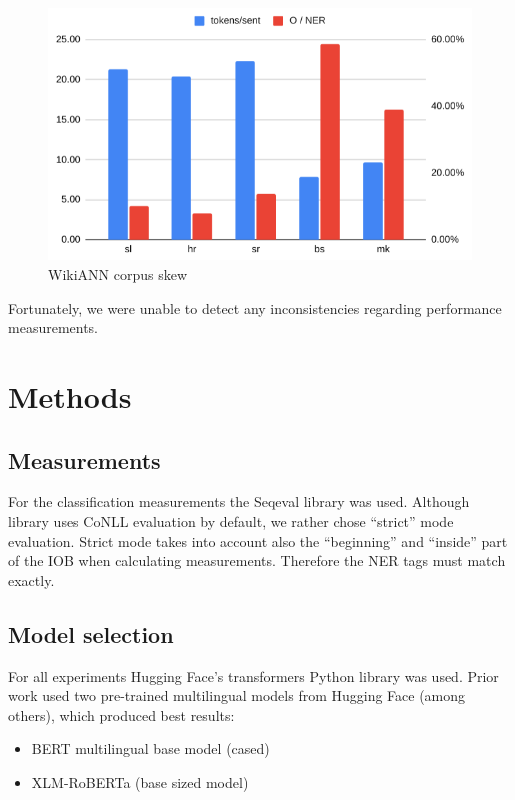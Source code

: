 \documentclass[sigconf]{acmart}
\begin{document}
\begin{figure}[h]
  \caption{WikiANN corpus skew}
  \label{fig:corpora_analysis}
  \centering
  \includegraphics[width=\linewidth]{wikiann-skew}
\end{figure}

Fortunately, we were unable to detect any inconsistencies regarding performance measurements.

\section{Methods}
\label{sec:methods}

\subsection{Measurements}
\label{subsec:measurements}
For the classification measurements the Seqeval library\cite{seqeval} was used.
Although library uses CoNLL evaluation by default, we rather chose ``strict'' mode evaluation.
Strict mode takes into account also the ``beginning'' and ``inside'' part of the IOB when calculating measurements.
Therefore the NER tags must match exactly.

\subsection{Model selection}
\label{subsec:model-selection}
For all experiments Hugging Face's transformers Python library\cite{wolf-etal-2020-transformers} was used.
Prior work used two pre-trained multilingual models from Hugging Face (among others), which produced best results:
\begin{itemize}
  \item BERT multilingual base model (cased)\cite{DBLP:journals/corr/abs-1810-04805}
  \item XLM-RoBERTa (base sized model)\cite{DBLP:journals/corr/abs-1911-02116}
\end{itemize}
\end{document}

